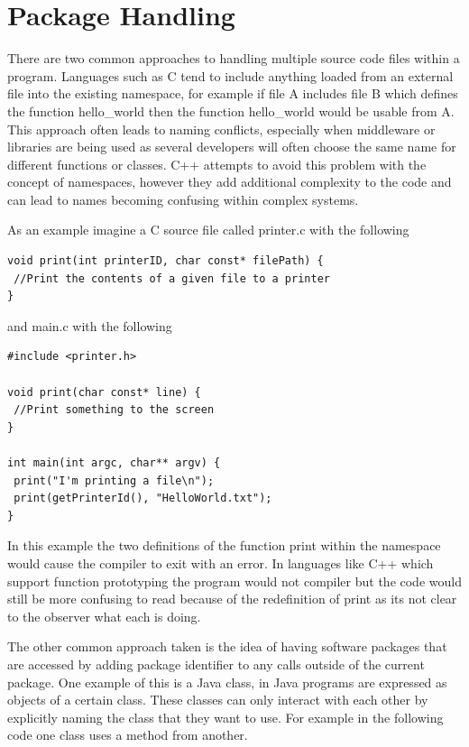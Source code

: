 \documentclass[]{final_report}
\begin{document}
\chapter{Package Handling}

There are two common approaches to handling multiple source code files within a program. Languages such as C tend to include anything loaded from an external file into the existing namespace, for example if file A includes file B which defines the function hello\_world then the function hello\_world would be usable from A. This approach often leads to naming conflicts, especially when middleware or libraries are being used as several developers will often choose the same name for different functions or classes. C++ attempts to avoid this problem with the concept of namespaces, however they add additional complexity to the code and can lead to names becoming confusing within complex systems.

As an example imagine a C source file called printer.c with the following

\begin{verbatim}
void print(int printerID, char const* filePath) {
 //Print the contents of a given file to a printer
}
\end{verbatim}

and main.c with the following
\begin{verbatim}
#include <printer.h>

void print(char const* line) {
 //Print something to the screen
}

int main(int argc, char** argv) {
 print("I'm printing a file\n");
 print(getPrinterId(), "HelloWorld.txt");
}
\end{verbatim}

In this example the two definitions of the function print within the namespace would cause the compiler to exit with an error. In languages like C++ which support function prototyping the program would not compiler but the code would still be more confusing to read because of the redefinition of print as its not clear to the observer what each is doing.

The other common approach taken is the idea of having software packages that are accessed by adding  package identifier to any calls outside of the current package. One example of this is a Java class, in Java programs are expressed as objects of a certain class. These classes can only interact with each other by explicitly naming the class that they want to use. For example in the following code one class uses a method from another.
\end{document}
